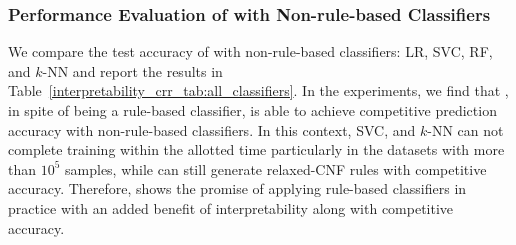  
 
 
 

\subsubsection{Performance Evaluation of {\crr} with Non-rule-based Classifiers}

We compare  the  test accuracy of {\crr} with  non-rule-based classifiers:  LR, SVC, RF, and $ k $-NN and report the results in Table~\ref{interpretability_crr_tab:all_classifiers}. In the experiments, we  find that {\crr},  in spite of being a rule-based classifier, is able to achieve competitive prediction accuracy with non-rule-based classifiers.  In this context, SVC, and $ k $-NN  can not complete training  within the allotted time particularly in the  datasets with more than $ 10^5 $ samples, while {\crr} can still generate relaxed-CNF rules with competitive accuracy. 
Therefore, {\crr} shows the promise of applying rule-based classifiers in practice with an added benefit of interpretability along with competitive accuracy.







